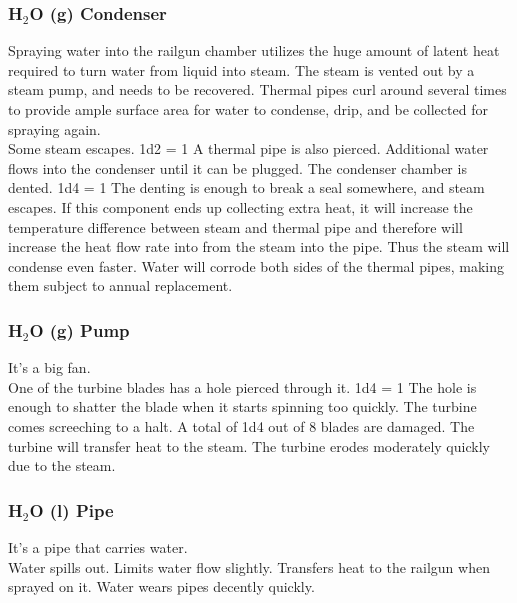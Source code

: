 \documentclass[a4paper]{article}
\begin{document}
\vspace{-0.5cm} \hspace{-18pt} \subsubsection{H$_2$O (g) Condenser} \label{railgun_h2o_condenser} \vspace{-0.2cm}
Spraying water into the railgun chamber utilizes the huge amount of latent heat required to turn water from liquid into steam. The steam is vented out by a steam pump, and needs to be recovered. Thermal pipes curl around several times to provide ample surface area for water to condense, drip, and be collected for spraying again.
\\ \pbhw
{Some steam escapes. \newline 1d2 = 1 A thermal pipe is also pierced. Additional water flows into the condenser until it can be plugged.}
{The condenser chamber is dented. \newline 1d4 = 1 The denting is enough to break a seal somewhere, and steam escapes.}
{If this component ends up collecting extra heat, it will increase the temperature difference between steam and thermal pipe and therefore will increase the heat flow rate into from the steam into the pipe. Thus the steam will condense even faster.}
{Water will corrode both sides of the thermal pipes, making them subject to annual replacement.}


\vspace{-0.5cm} \hspace{-18pt} \subsubsection{H$_2$O (g) Pump} \label{railgun_h2o_g_pump} \vspace{-0.2cm}
It's a big fan.
\\ \pbhw
{One of the turbine blades has a hole pierced through it. \newline 1d4 = 1 The hole is enough to shatter the blade when it starts spinning too quickly. }
{The turbine comes screeching to a halt. A total of 1d4 out of 8 blades are damaged.}
{The turbine will transfer heat to the steam. }
{The turbine erodes moderately quickly due to the steam.}


\vspace{-0.5cm} \hspace{-18pt} \subsubsection{H$_2$O (l) Pipe} \label{railgun_h2o_pipe} \vspace{-0.2cm}
It's a pipe that carries water.
\\ \pbhw
{Water spills out.}
{Limits water flow slightly.}
{Transfers heat to the railgun when sprayed on it.}
{Water wears pipes decently quickly.}
\end{document}
